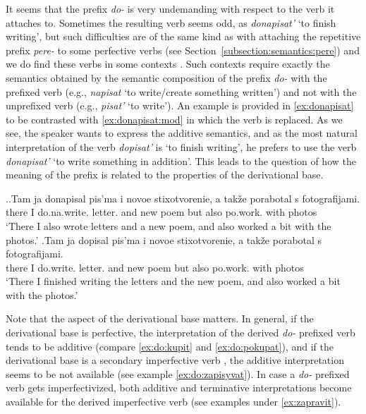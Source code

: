 It seems that the prefix \textit{do-}   is very undemanding with respect to the verb it attaches to. Sometimes the resulting verb seems odd, as \textit{donapisat'} `to finish writing', but such difficulties are of the same kind as with attaching the repetitive  prefix \textit{pere-}   to some perfective verbs  (see Section~\ref{subsection:semantics:pere}) and we do find these verbs in some contexts  . Such contexts   require exactly the semantics obtained by the semantic composition of the prefix \textit{do-}   with the prefixed verb (e.g., \textit{napisat} `to write/create something written') and not with the unprefixed verb (e.g., \textit{pisat'} `to write'). An example is provided in \ref{ex:donapisat} to be contrasted with \ref{ex:donapisat:mod} in which the verb is replaced. As we see, the speaker wants to express the additive semantics, and as the most natural interpretation of the verb \textit{dopisat'} is `to finish writing', he prefers to use the verb \textit{donapisat'} `to write something in addition'. This leads to the question of how the meaning of the prefix is related to the properties of the derivational base.

\ex.\ag.\label{ex:donapisat}Tam ja donapisal pis'ma i novoe stixotvorenie, a tak\v{z}e porabotal s fotografijami.\\
there I do.na.write. letter. and new poem but also po.work. with photos\\
\trans `There I also wrote letters and a new poem, and also worked a bit with the photos.'
\bg.\label{ex:donapisat:mod}Tam ja dopisal pis'ma i novoe stixotvorenie, a tak\v{z}e porabotal s fotografijami.\\
there I do.write. letter. and new poem but also po.work. with photos\\
\trans `There I finished writing the letters and the new poem, and also worked a bit with the photos.'

Note that the aspect of the derivational base matters. In general, if the derivational base is perfective, the interpretation of the derived \textit{do-}  prefixed verb tends to be additive (compare \ref{ex:do:kupit} and \ref{ex:do:pokupat}), and if the derivational base is a secondary imperfective  verb , the additive interpretation seems to be not available (see example \ref{ex:do:zapisyvat}). In case a \textit{do-}  prefixed verb gets imperfectivized, both additive and terminative  interpretations become available for the derived imperfective verb  (see examples under \ref{ex:zapravit}).

